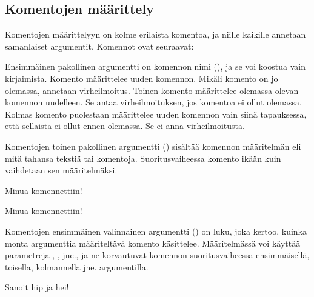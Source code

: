 \subsection{Komentojen määrittely}
\label{luku:komennot-määr}

Komentojen määrittelyyn on kolme erilaista komentoa, ja niille kaikille
annetaan samanlaiset argumentit. Komennot ovat seuraavat:

\begin{koodilohkosis}
  \newcommand     {\nimi}[n][oletus]{määritelmä}
  \renewcommand   {\nimi}[n][oletus]{määritelmä}
  \providecommand {\nimi}[n][oletus]{määritelmä}
\end{koodilohkosis}

Ensimmäinen pakollinen argumentti on komennon nimi (), ja se voi koostua vain kirjaimista. Komento  määrittelee uuden komennon. Mikäli komento on jo olemassa,
annetaan virheilmoitus. Toinen komento 
määrittelee olemassa olevan komennon uudelleen. Se antaa
virheilmoituksen, jos komentoa ei ollut olemassa. Kolmas komento
 puolestaan määrittelee uuden komennon
vain siinä tapauksessa, että sellaista ei ollut ennen olemassa. Se ei
anna virheilmoitusta.

Komentojen toinen pakollinen argumentti ()
sisältää komennon määritelmän eli mitä tahansa tekstiä tai komentoja.
Suoritusvaiheessa komento ikään kuin vaihdetaan sen määritelmäksi.


\begin{koodilohkosis}
  \newcommand{\komento}{Minua komennettiin!}
  \komento
\end{koodilohkosis}

\begin{tulossis}
  Minua komennettiin!
\end{tulossis}

Komentojen ensimmäinen valinnainen argumentti () on luku, joka
kertoo, kuinka monta argumenttia määriteltävä komento käsittelee.
Määritelmässä voi käyttää parametreja , ,
 jne., ja ne korvautuvat komennon suoritusvaiheessa
ensimmäisellä, toisella, kolmannella jne. argumentilla.


\begin{koodilohkosis}
  \newcommand{\komento}[2]{Sanoit #1 ja #2!}
  \komento{hip}{hei}
\end{koodilohkosis}

